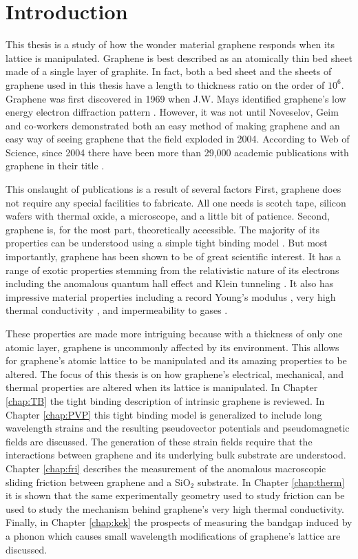 \chapter{Introduction}

This thesis is a study of how the wonder material graphene responds when its lattice is manipulated.
Graphene is best described as an atomically thin bed sheet made of a single layer of graphite.
In fact, both a bed sheet and the sheets of graphene used in this thesis have a length to thickness ratio on the order of $10^6$.
Graphene was first discovered in 1969 when J.W. Mays identified graphene's low energy electron diffraction pattern \cite{May1969}. 
However, it was not until Noveselov, Geim and co-workers demonstrated both an easy method of making graphene and an easy way of seeing graphene \cite{Novoselov2004} that the field exploded in 2004.
According to Web of Science, since 2004 there have been more than 29,000 academic publications with graphene in their title \cite{WoS}.

This onslaught of publications is a result of several factors
First, graphene does not require any special facilities to fabricate.
All one needs is scotch tape, silicon wafers with thermal oxide, a microscope, and a little bit of patience.
Second, graphene is, for the most part, theoretically accessible.
The majority of its properties can be understood using a simple tight binding model \cite{CastroNeto2009}.
But most importantly, graphene has been shown to be of great scientific interest.
It has a range of exotic properties stemming from the relativistic nature of its electrons including the anomalous quantum hall effect \cite{Zhang2005} and Klein tunneling \cite{Young2009}.
It also has impressive material properties including a record Young’s modulus \cite{Lee2008}, very high thermal conductivity \cite{Faugeras2010}, and impermeability to gases \cite{Bunch2008}.

These properties are made more intriguing because with a thickness of only one atomic layer, graphene is uncommonly affected by its environment.
This allows for graphene's atomic lattice to be manipulated and its amazing properties to be altered.
The focus of this thesis is on how graphene's electrical, mechanical, and thermal properties are altered when its lattice is manipulated.
In Chapter \ref{chap:TB} the tight binding description of intrinsic graphene is reviewed.
In Chapter \ref{chap:PVP} this tight binding model is generalized to include long wavelength strains and the resulting pseudovector potentials and pseudomagnetic fields are discussed.
The generation of these strain fields require that the interactions between graphene and its underlying bulk substrate are understood.
Chapter \ref{chap:fri} describes the measurement of the anomalous macroscopic sliding friction between graphene and a SiO$_2$ substrate.
In Chapter \ref{chap:therm} it is shown that the same experimentally geometry used to study friction can be used to study the mechanism behind graphene's very high thermal conductivity.
Finally, in Chapter \ref{chap:kek} the prospects of measuring the bandgap induced by a phonon which causes small wavelength modifications of graphene's lattice are discussed.